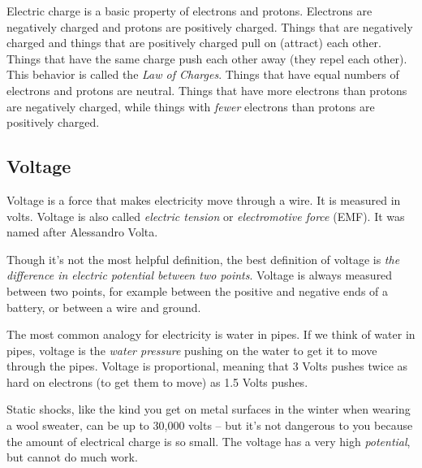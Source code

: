 Electric charge is a basic property of electrons and protons. Electrons are negatively charged and protons are positively charged. Things that are negatively charged and things that are positively charged pull on (attract) each other. Things that have the same charge push each other away (they repel each other). This behavior is called the \emph{Law of Charges}. Things that have equal numbers of electrons and protons are neutral. Things that have more electrons than protons are negatively charged, while things with \emph{fewer} electrons than protons are positively charged. 



\subsection*{Voltage}

Voltage is a force that makes electricity move through a wire. It is measured in volts. Voltage is also called \emph{electric tension} or \emph{electromotive force} (EMF). It was named after Alessandro Volta.

Though it's not the most helpful definition, the best definition of voltage is \emph{the difference in electric potential between two points}. Voltage is always measured between two points, for example between the positive and negative ends of a battery, or between a wire and ground. 

The most common analogy for electricity is water in pipes. If we think of water in pipes, voltage is the \emph{water pressure} pushing on the water to get it to move through the pipes. Voltage is proportional, meaning that 3 Volts pushes twice as hard on electrons (to get them to move) as 1.5 Volts pushes.

Static shocks, like the kind you get on metal surfaces in the winter when wearing a wool sweater, can be up to 30,000 volts -- but it's not dangerous to you because the amount of electrical charge is so small. The voltage has a very high \emph{potential}, but cannot do much work.

